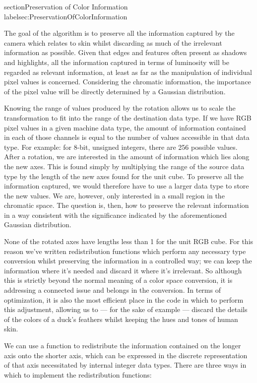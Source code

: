 section{Preservation of Color Information}\\label{sec:PreservationOfColorInformation}

The goal of the algorithm is to preserve all the information captured by the camera which relates to skin whilst discarding as much of the irrelevant information as possible. Given that edges and features often present as shadows and highlights, all the information captured in terms of luminosity will be regarded as relevant information, at least as far as the manipulation of individual pixel values is concerned. Considering the chromatic information, the importance of the pixel value will be directly determined by a Gaussian distribution.

Knowing the range of values produced by the rotation allows us to scale the transformation to fit into the range of the destination data type. If we have RGB pixel values in a given machine data type, the amount of information contained in each of those channels is equal to the number of values accessible in that data type. For example: for 8-bit, unsigned integers, there are 256 possible values. After a rotation, we are interested in the amount of information which lies along the new axes. This is found simply by multiplying the range of the source data type by the length of the new axes found for the unit cube. To preserve all the information captured, we would therefore have to use a larger data type to store the new values. We are, however, only interested in a small region in the chromatic space. The question is, then, how to preserve the relevant information in a way consistent with the significance indicated by the aforementioned Gaussian distribution.


None of the rotated axes have lengths less than 1 for the unit RGB cube. For this reason we've written redistribution functions which perform any necessary type conversion whilst preserving the information in a controlled way; we can keep the information where it's needed and discard it where it's irrelevant. So although this is strictly beyond the normal meaning of a color space conversion, it is addressing a connected issue and belongs in the conversion. In terms of optimization, it is also the most efficient place in the code in which to perform this adjustment, allowing us to --- for the sake of example --- discard the details of the colors of a duck's feathers whilst keeping the hues and tones of human skin.

We can use a function to redistribute the information contained on the longer axis onto the shorter axis, which can be expressed in the discrete representation of that axis necessitated by internal integer data types. There are three ways in which to implement the redistribution functions:

